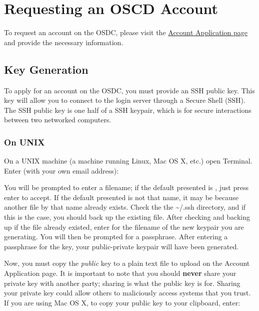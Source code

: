 \documentclass[letterpaper,10pt,english]{sphinxmanual}
\begin{document}
\section{Requesting an OSCD Account}
\label{gettingstarted:requesting-an-oscd-account}
To request an account on the OSDC, please visit the \href{https://www.opensciencedatacloud.org/apply/}{Account Application page} and provide the necessary information.


\subsection{Key Generation}
\label{gettingstarted:key-generation}
To apply for an account on the OSDC, you must provide an SSH public key. This key will allow you to connect to the login server through a Secure Shell (SSH). The SSH public key is one half of a SSH keypair, which is for secure interactions between two networked computers.


\subsubsection{On UNIX}
\label{gettingstarted:on-unix}
On a UNIX machine (a machine running Linux, Mac OS X, etc.) open Terminal. Enter (with your own email address):
\begin{quote}

\end{quote}

You will be prompted to enter a filename; if the default presented is , just press enter to accept. If the default presented is not that name, it may be because another file by that name already exists. Check the the \textasciitilde{}/.ssh directory, and if this is the case, you should back up the existing  file. After checking and backing up if the file already existed, enter  for the filename of the new keypair you are generating. You will then be prompted for a passphrase. After entering a passphrase for the key, your public-private keypair will have been generated.

Now, you must copy the \emph{public} key to a plain text file to upload on the Account Application page. It is important to note that you should \textbf{never} share your private key with another party; sharing is what the public key is for. Sharing your private key could allow others to maliciously access systems that you trust. If you are using Mac OS X, to copy your public key to your clipboard, enter:
\begin{quote}

\end{quote}
\end{document}
